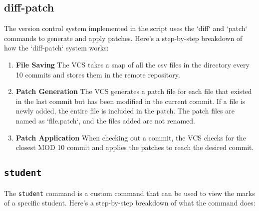 \documentclass{article}
\begin{document}
\subsection{diff-patch}
The version control system implemented in the script uses the `diff` and `patch` commands to generate and apply patches. Here's a step-by-step breakdown of how the `diff-patch` system works:

\begin{enumerate}
    \item \textbf{File Saving} The VCS takes a snap of all the csv files in the directory every 10 commits and stores them in the remote repository.
    
    \item \textbf{Patch Generation} The VCS generates a patch file for each file that existed in the last commit but has been modified in the current commit. If a file is newly added, the entire file is included in the patch. The patch files are named as `file.patch`, and the files added are not renamed.
    
    \item \textbf{Patch Application} When checking out a commit, the VCS checks for the closest MOD 10 commit and applies the patches to reach the desired commit.
\end{enumerate}

\subsection{\texttt{student}}
The \texttt{student} command is a custom command that can be used to view the marks of a specific student. Here's a step-by-step breakdown of what the command does:
\end{document}
